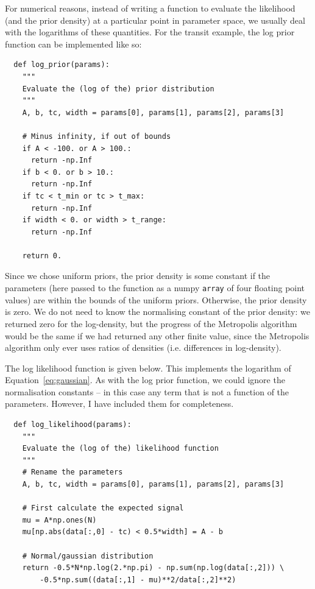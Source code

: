 For numerical reasons, instead of writing a function to evaluate the likelihood
(and the prior density) at a particular point in parameter space, we usually
deal with the logarithms of these quantities. For the transit example, the
log prior function can be implemented like so:

\begin{verbatim}
  def log_prior(params):
    """
    Evaluate the (log of the) prior distribution
    """
    A, b, tc, width = params[0], params[1], params[2], params[3]

    # Minus infinity, if out of bounds
    if A < -100. or A > 100.:
      return -np.Inf
    if b < 0. or b > 10.:
      return -np.Inf
    if tc < t_min or tc > t_max:
      return -np.Inf
    if width < 0. or width > t_range:
      return -np.Inf

    return 0.
\end{verbatim}

Since we chose uniform priors, the prior density is some constant if the
parameters (here passed to the function as a numpy {\tt array} of four
floating point values) are within the bounds of the uniform priors. Otherwise,
the prior density is zero. We do not need to know the normalising constant
of the prior density: we returned zero for the log-density, but the progress
of the Metropolis algorithm would be the same if we had returned any other
finite value, since the Metropolis algorithm only ever uses ratios of densities
(i.e. differences in log-density).

The log likelihood function is given below. This implements the logarithm of
Equation~\ref{eq:gaussian}. As with the log prior function, we could ignore the
normalisation constants -- in this case any term that is not a function of the
parameters. However, I have included them for completeness.

\begin{verbatim}
  def log_likelihood(params):
    """
    Evaluate the (log of the) likelihood function
    """
    # Rename the parameters
    A, b, tc, width = params[0], params[1], params[2], params[3]

    # First calculate the expected signal
    mu = A*np.ones(N)
    mu[np.abs(data[:,0] - tc) < 0.5*width] = A - b

    # Normal/gaussian distribution
    return -0.5*N*np.log(2.*np.pi) - np.sum(np.log(data[:,2])) \
        -0.5*np.sum((data[:,1] - mu)**2/data[:,2]**2)
\end{verbatim}



